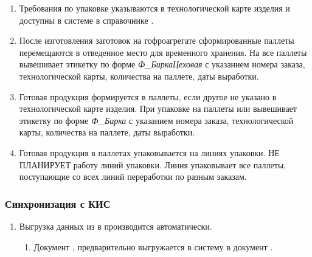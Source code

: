 \begin{enumerate}

\item	Требования по упаковке указываются в технологической карте изделия и доступны в системе \gofro в справочнике .
\item	После изготовления заготовок на гофроагрегате сформированные паллеты перемещаются в отведенное место для временного хранения. На все паллеты \gaoperator вывешивает этикетку по форме \textit{Ф\_БиркаЦеховая} с указанием номера заказа, технологической карты, количества на паллете, даты выработки.
\item	Готовая продукция формируется в паллеты, если другое не указано в технологической карте изделия. При упаковке на паллеты \gaoperator или \operator  вывешивает этикетку по форме \textit{Ф\_Бирка} с указанием номера заказа, технологической карты, количества на паллете, даты выработки. 
\item	Готовая продукция в паллетах упаковывается на линиях упаковки. \planner НЕ ПЛАНИРУЕТ работу линий упаковки. Линия упаковывает все паллеты, поступающие со всех линий переработки по разным заказам. 
\end{enumerate}








\subsubsection{Синхронизация с КИС}
\label{bp:production_exchange}

\begin{enumerate}
\item	Выгрузка данных из \gofro в \erp производится автоматически.

\begin{enumerate}

\item	Документ ,  предварительно выгружается в систему \erp в документ .

\end{enumerate}

\end{enumerate}